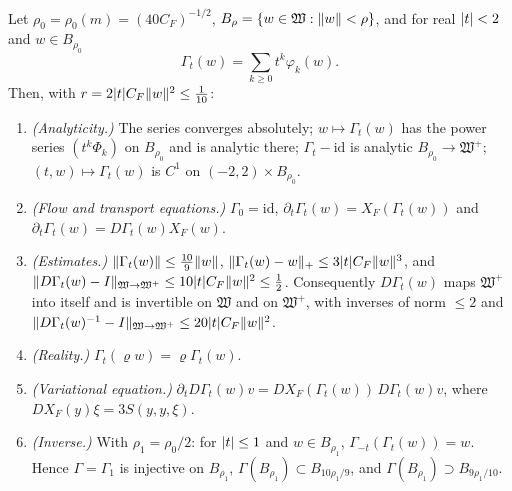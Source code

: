 \begin{theorem}\label{bpW:w3:flow}
Let $\rho_0=\rho_0(m)=(40C_F)^{-1/2}$, $B_\rho=\{w\in\mathfrak W:\lVert w\rVert<\rho\}$, and for real $\lvert t\rvert<2$ and
$w\in B_{\rho_0}$
\[\Gamma_t(w)=\sum_{k\ge0}t^k\varphi_k(w).\]
Then, with $r=2\lvert t\rvert C_F\lVert w\rVert^2\le\frac1{10}$:
\begin{enumerate}[label=(\roman*)]
\item \emph{(Analyticity.)} The series converges absolutely; $w\mapsto\Gamma_t(w)$ has the power series
  $(t^k\Phi_k)$ on $B_{\rho_0}$ and is analytic there; $\Gamma_t-\mathrm{id}$ is analytic $B_{\rho_0}\to\mathfrak W^+$;
  $(t,w)\mapsto\Gamma_t(w)$ is $C^1$ on $(-2,2)\times B_{\rho_0}$.
\item \emph{(Flow and transport equations.)} $\Gamma_0=\mathrm{id}$,
  $\partial_t\Gamma_t(w)=X_F(\Gamma_t(w))$ and $\partial_t\Gamma_t(w)=D\Gamma_t(w)X_F(w)$.
\item \emph{(Estimates.)} $\lVert \Gamma_t(w)\rVert\le\frac{10}9\lVert w\rVert$,
  $\lVert \Gamma_t(w)-w\rVert_+\le3\lvert t\rvert C_F\lVert w\rVert^3$, and $\lVert D\Gamma_t(w)-I\rVert_{\mathfrak W\to\mathfrak W^+}\le10\lvert t\rvert C_F\lVert w\rVert^2\le\frac12$.
  Consequently $D\Gamma_t(w)$ maps $\mathfrak W^+$ into itself and is invertible on $\mathfrak W$ and on
  $\mathfrak W^+$, with inverses of norm $\le2$ and
  $\lVert D\Gamma_t(w)^{-1}-I\rVert_{\mathfrak W\to\mathfrak W^+}\le20\lvert t\rvert C_F\lVert w\rVert^2$.
\item \emph{(Reality.)} $\Gamma_t(\varrho w)=\varrho\Gamma_t(w)$.
\item \emph{(Variational equation.)} $\partial_tD\Gamma_t(w)v=DX_F(\Gamma_t(w))\,D\Gamma_t(w)v$, where
  $DX_F(y)\xi=3S(y,y,\xi)$.
\item \emph{(Inverse.)} With $\rho_1=\rho_0/2$: for $\lvert t\rvert\le1$ and $w\in B_{\rho_1}$,
  $\Gamma_{-t}(\Gamma_t(w))=w$. Hence $\Gamma=\Gamma_1$ is injective on $B_{\rho_1}$,
  $\Gamma(B_{\rho_1})\subset B_{10\rho_1/9}$, and $\Gamma(B_{\rho_1})\supset B_{9\rho_1/10}$.
\end{enumerate}
\end{theorem}

